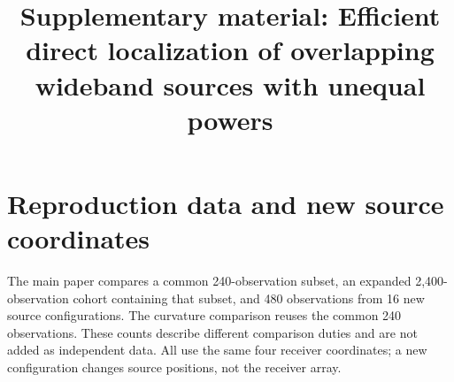 \documentclass[a4paper,12pt,review]{cas-sc}
\begin{document}
\let\WriteBookmarks\relax
{}
\shortauthors{}
\title[mode=title]{Supplementary material: Efficient direct localization of overlapping wideband sources with unequal powers}
\maketitle
\renewcommand{\thesection}{S\arabic{section}}

\section{Reproduction data and new source coordinates}
The main paper compares a common 240-observation subset, an expanded 2,400-observation cohort containing that subset, and 480 observations from 16 new source configurations. The curvature comparison reuses the common 240 observations. These counts describe different comparison duties and are not added as independent data. All use the same four receiver coordinates; a new configuration changes source positions, not the receiver array.
\end{document}
